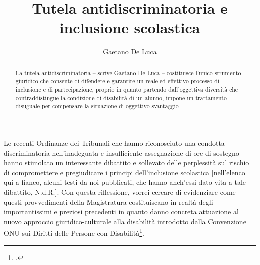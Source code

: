 \author{Gaetano De Luca}
\title{Tutela antidiscriminatoria e inclusione scolastica}
\label{cha:DeLuca140113}
\begin{abstract}
La tutela antidiscriminatoria – scrive Gaetano De Luca – costituisce l'unico strumento giuridico che consente di difendere e garantire un reale ed effettivo processo di inclusione e di partecipazione, proprio in quanto partendo dall'oggettiva diversità che contraddistingue la condizione di disabilità di un alunno, impone un trattamento disuguale per compensare la situazione di oggettivo svantaggio
\end{abstract}
\maketitle
{}
Le recenti Ordinanze dei Tribunali che hanno riconosciuto una condotta discriminatoria nell'inadeguata e insufficiente assegnazione di ore di sostegno hanno stimolato un interessante dibattito e sollevato delle perplessità sul rischio di compromettere e pregiudicare i principi dell'inclusione scolastica [nell'elenco qui a fianco, alcuni testi da noi pubblicati, che hanno anch'essi dato vita a tale dibattito, N.d.R.].
Con questa riflessione, vorrei cercare di evidenziare come questi provvedimenti della Magistratura costituiscano in realtà degli importantissimi e preziosi precedenti in quanto danno concreta attuazione al nuovo approccio giuridico-culturale alla disabilità introdotto dalla Convenzione ONU sui Diritti delle Persone con Disabilità\footcite{onu2006}.

